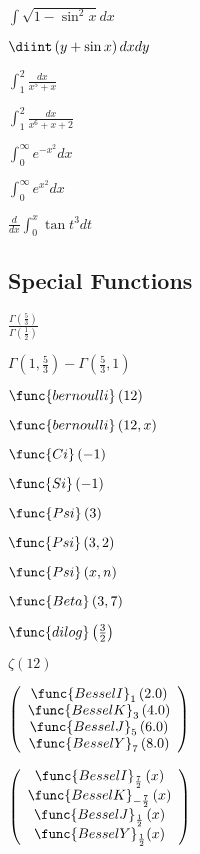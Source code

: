 \documentclass{article}
\begin{document}
$\int \sqrt{1-\sin ^{2}x}dx$

$\diint \left( y+\sin x\right) dxdy$

$\int_{1}^{2}\frac{dx}{x^{5}+x}$

$\int_{1}^{2}\frac{dx}{x^{6}+x+2}$

$\int_{0}^{\infty }e^{-x^{2}}dx$

$\int_{0}^{\infty }e^{x^{2}}dx$

$\frac{d}{dx}\int_{0}^{x}\tan t^{3}dt$

\subsection{Special Functions}

$\frac{\Gamma \left( \frac{5}{3}\right) }{\Gamma \left( \frac{1}{2}\right) }$

$\Gamma \left( 1,\frac{5}{3}\right) -\Gamma \left( \frac{5}{3},1\right) $

$\func{bernoulli}\left( 12\right) $

$\func{bernoulli}\left( 12,x\right) $

$\func{Ci}\left( -1\right) $

$\func{Si}\left( -1\right) $

$\func{Psi}\left( 3\right) $

$\func{Psi}\left( 3,2\right) $

$\func{Psi}\left( x,n\right) $

$\func{Beta}\left( 3,7\right) $

$\func{dilog}\left( \frac{3}{2}\right) $

$\zeta \left( 12\right) $

$\left( 
\begin{array}{c}
\func{BesselI}_{1}\left( 2.0\right) \\ 
\func{BesselK}_{3}\left( 4.0\right) \\ 
\func{BesselJ}_{5}\left( 6.0\right) \\ 
\func{BesselY}_{7}\left( 8.0\right)%
\end{array}%
\right) $

$\left( 
\begin{array}{c}
\func{BesselI}_{\frac{7}{2}}\left( x\right) \\ 
\func{BesselK}_{-\frac{7}{2}}\left( x\right) \\ 
\func{BesselJ}_{\frac{1}{2}}\left( x\right) \\ 
\func{BesselY}_{\frac{1}{2}}(x)%
\end{array}%
\right) $
\end{document}
